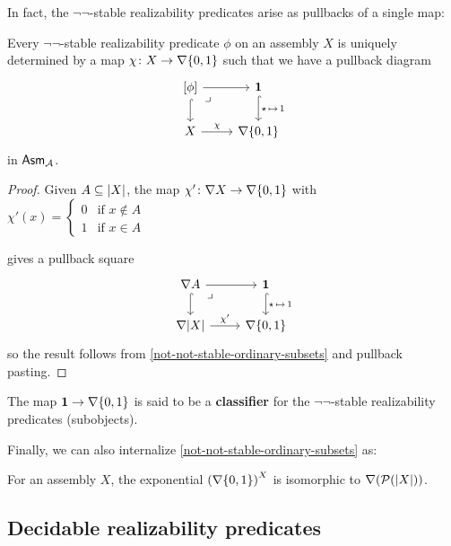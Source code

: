 In fact, the \(\lnot\lnot\)-stable realizability predicates arise as pullbacks
of a single map:

\begin{proposition}\label{nabla-two-classifies-not-not-stable}
  Every \(\lnot\lnot\)-stable realizability predicate \(\phi\) on an assembly
  \(X\) is uniquely determined by a map \(\chi \colon X \to \nabla\set{0,1}\)
  such that we have a pullback diagram
  \[
    \begin{tikzcd}
      {[\phi]} \ar[r] \ar[d,hookrightarrow] \pbcorner
      & \One \ar[d,hookrightarrow,"{\singleton \,\mapsto\, 1}"] \\
      X \ar[r,"\chi"] & \nabla\set{0,1}
    \end{tikzcd}
  \]
  in \(\Asm{\AA}\).
\end{proposition}
\begin{proof}
  Given \(A \subseteq \carrier{X}\), the map
  \(
    \chi' \colon \nabla X \to \nabla\set{0,1}\) with \(\chi'(x)
    = \begin{cases}
      0 &\text{if } x \not\in A \\
      1 &\text{if } x \in A
    \end{cases}
    \)

  gives a pullback square
  \[
    \begin{tikzcd}
      \nabla A \ar[r] \ar[d,hookrightarrow] \pbcorner
      & \One \ar[d,hookrightarrow,"{\singleton \,\mapsto\, 1}"] \\
      \nabla\carrier{X} \ar[r,"\chi'"] & \nabla\set{0,1}
    \end{tikzcd}
  \]
  so the result follows from
  \cref{not-not-stable-ordinary-subsets} and pullback pasting.
\end{proof}

The map \(\One \to \nabla\set{0,1}\) is said to be a \textbf{classifier} for the
\(\lnot\lnot\)-stable realizability predicates (subobjects).

Finally, we can also internalize \cref{not-not-stable-ordinary-subsets} as:
\begin{exercise}\label{exer:nabla-two-nat-exp}
  For an assembly \(X\), the exponential \(\pa*{\nabla\set{0,1}}^X\) is
  isomorphic to \(\nabla(\powerset(\carrier{X}))\).
\end{exercise}

\subsection{Decidable realizability predicates}\label{sec:decidable-realizability-predicates}

